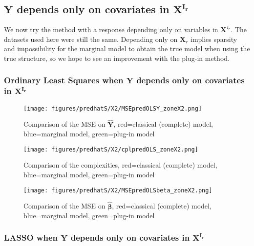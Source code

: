 \documentclass[12pt,a4paper]{report}
\begin{document}
\clearpage
	
	\subsection{$\boldsymbol{Y}$ depends only on covariates in $\boldsymbol{X^{I_r}}$ }	 \label{tableMSEsimgauchepred}
We now try the method with a response depending only on variables in $\boldsymbol{X}^{I_r}$. The datasets used here were still the same.
Depending only on $\boldsymbol{X}_r$ implies sparsity and impossibility for the marginal model to obtain the true model when using the true structure, so we hope to see an improvement with the plug-in method.


\FloatBarrier

\newpage

\subsubsection{Ordinary Least Squares when $\boldsymbol{Y}$ depends only on covariates in $\boldsymbol{X^{I_r}}$}

	\begin{figure}[h!]
	\centering
		  \texttt{[image: figures/predhatS/X2/MSEpredOLSY\_zoneX2.png]}
		\caption{Comparison of the MSE on $\hat{\boldsymbol{Y}}$, red=classical (complete) model, blue=marginal model, green=plug-in model}\label{MSEpredOLSY_zoneX2}
	\end{figure}
	\begin{figure}[h!]
	\centering
		  \texttt{[image: figures/predhatS/X2/cplpredOLS\_zoneX2.png]}
		\caption{Comparison of the complexities, red=classical (complete) model, blue=marginal model, green=plug-in model}\label{cplpredOLS_zoneX2}
	\end{figure}
	\begin{figure}[h!]
	\centering
		  \texttt{[image: figures/predhatS/X2/MSEpredOLSbeta\_zoneX2.png]}
		\caption{Comparison of the MSE on $\hat{\boldsymbol{\beta}}$, red=classical (complete) model, blue=marginal model, green=plug-in model}\label{MSEpredOLSbeta_zoneX2}
	\end{figure}
	\FloatBarrier
\newpage
\subsubsection{LASSO when $\boldsymbol{Y}$ depends only on covariates in $\boldsymbol{X^{I_r}}$}
\end{document}
